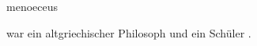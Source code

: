 \documentclass{stex}
\begin{document}
\begin{smodule}[sig=en]{menoeceus}
\begin{sparagraph}[style=symdoc]
 war ein altgriechischer Philosoph und ein
Schüler .
\end{sparagraph}
\end{smodule}
\end{document}
